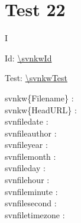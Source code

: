 \documentclass[12pt]{report}
\begin{document}
\raggedright

\chapter{Test 22}

\noindent
{} I 

Id: \url{\svnkwId}
\svnkwId

Test: \url{\svnkwTest}
\svnkwTest

 \noindent
 svnkw\{Filename\} :  \\
 svnkw\{HeadURL\}  :  \\
 svnfiledate : \svnfiledate  \\
 svnfileauthor : \svnfileauthor  \\
 svnfileyear : \svnfileyear  \\
 svnfilemonth : \svnfilemonth  \\
 svnfileday : \svnfileday  \\
 svnfilehour : \svnfilehour  \\
 svnfileminute : \svnfileminute  \\
 svnfilesecond : \svnfilesecond  \\
 svnfiletimezone : \svnfiletimezone  \\
\end{document}
